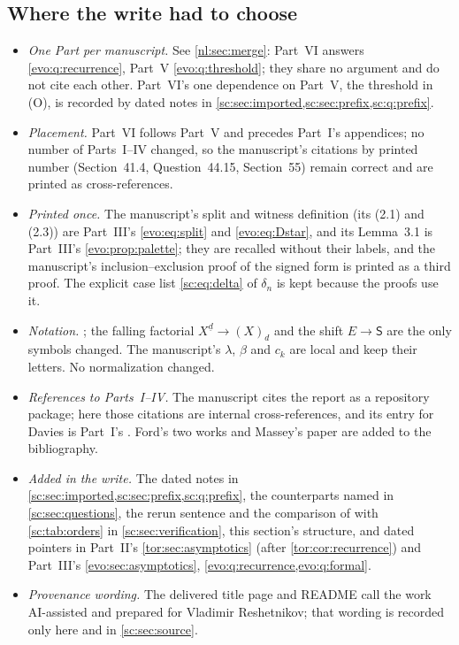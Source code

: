\documentclass[11pt,a4paper]{article}
\numberwithin{equation}{section}
\theoremstyle{definition}
\theoremstyle{remark}
\newcommand{\fall}[2]{(#1)_{#2}}
\begin{document}
\subsection{Where the write had to choose}\label{sc:sec:merge}
\begin{itemize}
\item \emph{One Part per manuscript.} See \cref{nl:sec:merge}: Part~VI
 answers \cref{evo:q:recurrence}, Part~V \cref{evo:q:threshold}; they share
 no argument and do not cite each other. Part~VI's one dependence on
 Part~V, the threshold in (O), is recorded by dated notes in
 \cref{sc:sec:imported,sc:sec:prefix,sc:q:prefix}.
\item \emph{Placement.} Part~VI follows Part~V and precedes Part~I's
 appendices; no number of Parts~I--IV changed, so the manuscript's
 citations by printed number (Section~41.4, Question~44.15, Section~55)
 remain correct and are printed as cross-references.
\item \emph{Printed once.} The manuscript's split and witness definition
 (its (2.1) and (2.3)) are Part~III's \eqref{evo:eq:split} and
 \eqref{evo:eq:Dstar}, and its Lemma~3.1 is Part~III's
 \cref{evo:prop:palette}; they are recalled without their labels, and the
 manuscript's inclusion--exclusion proof of the signed form is printed as
 a third proof. The explicit case list \eqref{sc:eq:delta} of $\delta_n$ is
 kept because the proofs use it.
\item \emph{Notation.} ; the falling factorial
 $X^{\underline d}\to\fall{X}{d}$ and the shift $E\to\mathsf S$ are the
 only symbols changed. The manuscript's $\lambda$, $\beta$ and $c_k$ are
 local and keep their letters. No normalization changed.
\item \emph{References to Parts~I--IV.} The manuscript cites the report as
 a repository package; here those citations are internal cross-references,
 and its entry for Davies is Part~I's \cite{Davies2017}. Ford's two works
 and Massey's paper are added to the bibliography.
\item \emph{Added in the write.} The dated notes in
 \cref{sc:sec:imported,sc:sec:prefix,sc:q:prefix}, the counterparts named
 in \cref{sc:sec:questions}, the rerun sentence and the comparison of
  with \cref{sc:tab:orders}
 in \cref{sc:sec:verification}, this section's structure, and dated
 pointers in Part~II's \cref{tor:sec:asymptotics} (after \cref{tor:cor:recurrence}) and Part~III's
 \cref{evo:sec:asymptotics}, \cref{evo:q:recurrence,evo:q:formal}.
\item \emph{Provenance wording.} The delivered title page and README call the
 work AI-assisted and prepared for Vladimir Reshetnikov; that wording is
 recorded only here and in \cref{sc:sec:source}.
\end{itemize}
\endgroup
\end{document}
